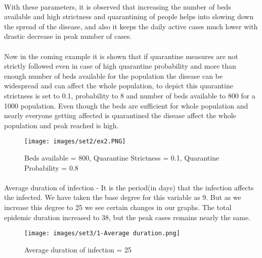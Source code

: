 \documentclass[12pt, a4paper]{extarticle}
\begin{document}
    \paragraph{} With these parameters, it is observed that increasing the number of beds available and high strictness and quarantining of people helps into slowing down the spread of the disease, and also it keeps the daily active cases much lower with drastic decrease in peak number of cases. 
    
    \newpage
    \paragraph{} Now in the coming example it is shown that if quarantine measures are not strictly followed even in case of high quarantine probability and more than enough number of beds available for the population the disease can be widespread and can affect the whole population, to depict this quarantine strictness is set to 0.1, probability to 8 and number of beds available to 800 for a 1000 population.
    Even though the beds are sufficient for whole population and nearly everyone getting affected is quarantined the disease affect the whole population and peak reached is high.
    \vspace{0.2in}
    \begin{figure}[h]
        \centering
        \texttt{[image: images/set2/ex2.PNG]}
        \caption{Beds available = 800, Quarantine Strictness = 0.1, Quarantine Probability = 0.8}
    \end{figure}
    
    \vspace{0.2in}
    \newpage
    \paragraph{} Average duration of infection - It is the period(in days) that the infection affects the infected. We have taken the base degree for this variable as 9. But as we increase this degree to 25 we see certain changes in our graphs. The total epidemic duration increased to 38, but the peak cases remains nearly the same.
    \vspace{0.2in}
    \begin{figure}[h]
        \centering
        \texttt{[image: images/set3/1-Average duration.png]}
        \caption{Average duration of infection = 25}
    \end{figure}
  
\end{document}
